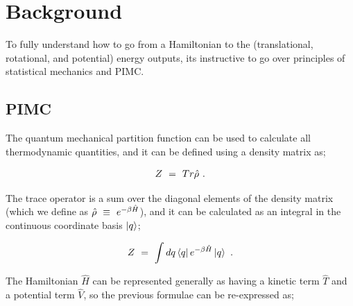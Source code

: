 \documentclass{ece}
\begin{document}
\section{Background}

To fully understand how to go from a Hamiltonian to the (translational, rotational, and potential) energy outputs, its instructive to go over principles of statistical mechanics and \gls{PIMC}. 

\subsection{PIMC}

The quantum mechanical partition function can be used to calculate all thermodynamic quantities, and it can be defined using a density matrix as;

\begin{equation} \label{eq:2}
Z \hspace{0.125cm} = \hspace{0.125cm} Tr \hat{\rho} \hspace{0.125cm} .
\end{equation}

The trace operator is a sum over the diagonal elements of the density matrix (which we define as \begin{math} \hat{\rho} \hspace{0.125cm} \equiv \hspace{0.125cm} e^{-\beta \hat{H}} \end{math}), and it can be calculated as an integral in the continuous coordinate basis \begin{math} \ket{q} \end{math};

\begin{equation} \label{eq:3}
Z \hspace{0.125cm} = \hspace{0.125cm} \int dq \bra{q} e^{-\beta \hat{H}} \ket{q} \hspace{0.125cm} .
\end{equation}

The Hamiltonian \begin{math} \hat{H} \end{math} can be represented generally as having a kinetic term \begin{math} \hat{T} \end{math} and a potential term \begin{math} \hat{V} \end{math}, so the previous formulae can be re-expressed as;
\end{document}
